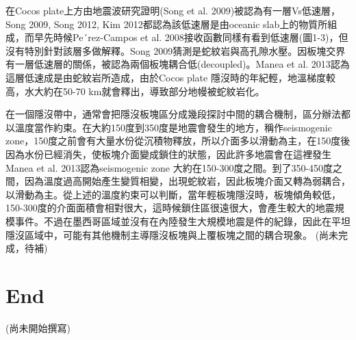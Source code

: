 在Cocos plate上方由地震波研究證明(Song et al. 2009)被認為有一層Vs低速層，Song 2009, Song 2012, Kim 2012都認為該低速層是由oceanic slab上的物質所組成，而早先時候Pe´rez-Campos et al. 2008接收函數同樣有看到低速層(圖1-3)，但沒有特別針對該層多做解釋。Song 2009猜測是蛇紋岩與高孔隙水壓。因板塊交界有一層低速層的關係，被認為兩個板塊耦合低(decoupled)。Manea et al. 2013認為這層低速成是由蛇紋岩所造成，由於Cocos plate 隱沒時的年紀輕，地溫梯度較高，水大約在50-70 km就會釋出，導致部分地幔被蛇紋岩化。

在一個隱沒帶中，通常會把隱沒板塊區分成幾段探討中間的耦合機制，區分辦法都以溫度當作約束。在大約150度到350度是地震會發生的地方，稱作seismogenic zone，150度之前會有大量水份從沉積物釋放，所以介面多以滑動為主，在150度後因為水份已經消失，使板塊介面變成鎖住的狀態，因此許多地震會在這裡發生 Manea et al. 2013認為seismogenic zone 大約在150-300度之間。到了350-450度之間，因為溫度過高開始產生變質相變，出現蛇紋岩，因此板塊介面又轉為弱耦合，以滑動為主。從上述的溫度約束可以判斷，當年輕板塊隱沒時，板塊傾角較低，150-300度的介面面積會相對很大，這時候鎖住區很遠很大，會產生較大的地震規模事件。不過在墨西哥區域並沒有在內陸發生大規模地震是件的紀錄，因此在平坦隱沒區域中，可能有其他機制主導隱沒板塊與上覆板塊之間的耦合現象。
(尚未完成，待補)


\section{End}

(尚未開始撰寫)